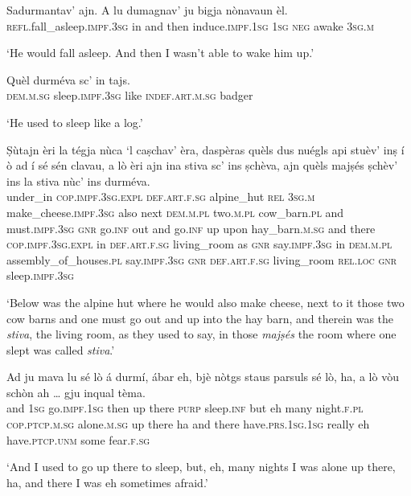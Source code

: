 \begin{linenumbers}
\gll  Sadurmantav’ ajn. A lu dumagnav’ ju bigja nònavaun èl.  \\
 \textsc{refl}.fall\_asleep.\textsc{impf.3sg} in and then induce.\textsc{impf.1sg} \textsc{1sg} \textsc{neg} awake \textsc{3sg.m}\\
\end{linenumbers}
\medskip
\glt `He would fall asleep. And  then I wasn't able to wake him up.'
\medskip

\begin{linenumbers}
\gll  Quèl durméva sc’ in tajs.  \\
 \textsc{dem.m.sg} sleep.\textsc{impf.3sg} like \textsc{indef.art.m.sg} badger\\
\end{linenumbers}
\medskip
\glt `He used to sleep like a log.'
\medskip

\begin{linenumbers}
\gll Ṣùtajn èri la tégja nùca `l caṣchav' èra, daspèras quèls dus nuégls api stuèv' inṣ í ò ad í sé sén clavau, a lò èri ajn ina stiva sc’ ins ṣchèva, ajn quèls majṣés ṣchèv’ ins la stiva nùc’ ins durméva.\\
under\_in \textsc{cop.impf.3sg.expl} \textsc{def.art.f.sg} alpine\_hut \textsc{rel} \textsc{3sg.m} make\_cheese.\textsc{impf.3sg} also next \textsc{dem.m.pl} two.\textsc{m.pl} cow\_barn.\textsc{pl} and must.\textsc{impf.3sg} \textsc{gnr} go.\textsc{inf} out and go.\textsc{inf} up upon hay\_barn.\textsc{m.sg} and there \textsc{cop.impf.3sg.expl} in \textsc{def.art.f.sg} living\_room as \textsc{gnr} say.\textsc{impf.3sg} in \textsc{dem.m.pl} assembly\_of\_houses.\textsc{pl} say.\textsc{impf.3sg} \textsc{gnr} \textsc{def.art.f.sg} living\_room  \textsc{rel.loc} \textsc{gnr} sleep.\textsc{impf.3sg}\\
\end{linenumbers}
\medskip
\glt `Below was the alpine hut where he would also make cheese, next to it those two cow barns and one must go out and up into the hay barn, and therein was the \textit{stiva}, the living room, as they used to say, in those \textit{majṣés} the room where one slept was called \textit{stiva}.'
\medskip

\begin{linenumbers}
\gll  Ad ju mava lu sé lò á durmí, ábar eh, bjè nòtgs staus parsuls sé lò, ha, a lò vòu schòn ah … gju inqual tèma.   \\
and \textsc{1sg} go.\textsc{impf.1sg} then up there  \textsc{purp} sleep.\textsc{inf} but eh many night.\textsc{f.pl} \textsc{cop.ptcp.m.sg} alone.\textsc{m.sg} up there ha and there have.\textsc{prs.1sg.1sg} really eh {} have.\textsc{ptcp.unm} some fear.\textsc{f.sg} \\
\end{linenumbers}
\medskip
\glt `And I used to go up there to sleep, but, eh, many nights I was alone up there, ha, and there I was eh sometimes afraid.'
\medskip

